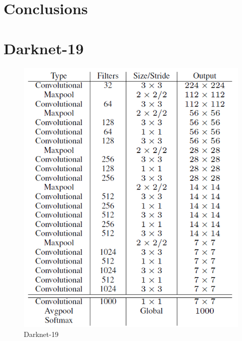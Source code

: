\documentclass[twoside]{ctuthesis}
\theoremstyle{plain}
\theoremstyle{definition}
\theoremstyle{note}
\begin{document}
\chapter{Conclusions}
\appendix
\chapter{Darknet-19}
\label{darknet-19}
\begin{figure}[H]
\caption{Darknet-19}
\includegraphics[width=.9\textwidth]{images/used_networks/yolov2_darknet.png}
\end{figure}
\end{document}

